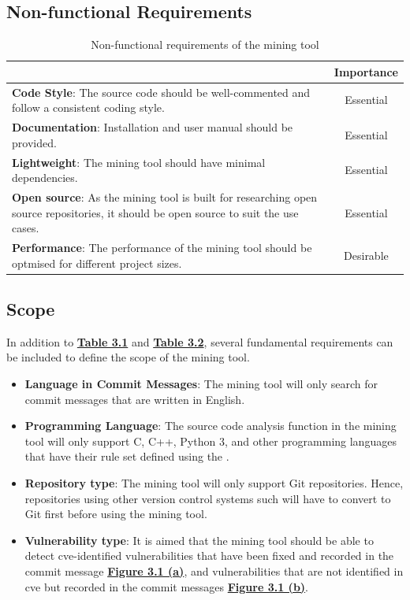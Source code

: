 \documentclass[12pt, a4paper]{report}
\begin{document}
\subsection{Non-functional Requirements}
\begin{table}[H]
	\begin{center}
		\begin{tabular}{|p{10.3cm}|c|}
			\hline
			\rowcolor[HTML]{D8D8D8}
			\multicolumn{1}{|c|}{Criteria} & Importance \\ \hline
			\textbf{Code Style}: The source code should be well-commented and follow a consistent coding
      style. & Essential \\ \hline
      \textbf{Documentation}: Installation and user manual should be provided. & Essential \\ \hline
      \textbf{Lightweight}: The mining tool should have minimal dependencies. & Essential \\ \hline
      \textbf{Open source}: As the mining tool is built for researching open source repositories, it
      should be open source to suit the use cases. & Essential \\ \hline
      \textbf{Performance}: The performance of the mining tool should be optmised for different
      project sizes. & Desirable \\ \hline
			\end{tabular}
		\caption{Non-functional requirements of the mining tool} \label{table:nonfunc_req}
	\end{center}
\end{table}

\subsection{Scope}
In addition to \hyperref[table:func_req]{\textbf{Table 3.1}} and
\hyperref[table:nonfunc_req]{\textbf{Table 3.2}}, several fundamental requirements can be included
to define the scope of the mining tool.

\begin{itemize}
	\item \textbf{Language in Commit Messages}: The mining tool will only search for commit messages
	that are written in English.
	\item \textbf{Programming Language}: The source code analysis function in the mining tool will
	only support C, C++, Python 3, and other programming languages that have their rule set defined
	using the .
	\item \textbf{Repository type}: The mining tool will only support Git repositories. Hence,
	repositories using other version control systems such will have to convert to Git first before
	using the mining tool.
	\item \textbf{Vulnerability type}: It is aimed that the mining tool should be able to detect
	\acrshort{cve}-identified vulnerabilities that have been fixed and recorded in the commit message
	\hyperref[figure:cve_vuln]{\textbf{Figure 3.1 (a)}}, and vulnerabilities that are not identified
	in \acrshort{cve} but recorded in the commit messages \hyperref[figure:common_vuln]{\textbf{Figure
	3.1 (b)}}.
\end{itemize}
\end{document}
